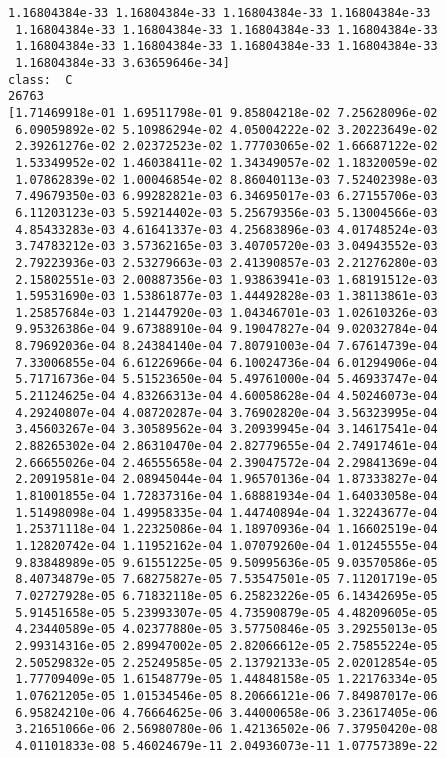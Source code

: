 \documentclass[11pt]{article}
\begin{document}
\begin{Verbatim}[commandchars=\\\{\}]
 1.16804384e-33 1.16804384e-33 1.16804384e-33 1.16804384e-33
 1.16804384e-33 1.16804384e-33 1.16804384e-33 1.16804384e-33
 1.16804384e-33 1.16804384e-33 1.16804384e-33 1.16804384e-33
 1.16804384e-33 3.63659646e-34]
class:  C
26763
[1.71469918e-01 1.69511798e-01 9.85804218e-02 7.25628096e-02
 6.09059892e-02 5.10986294e-02 4.05004222e-02 3.20223649e-02
 2.39261276e-02 2.02372523e-02 1.77703065e-02 1.66687122e-02
 1.53349952e-02 1.46038411e-02 1.34349057e-02 1.18320059e-02
 1.07862839e-02 1.00046854e-02 8.86040113e-03 7.52402398e-03
 7.49679350e-03 6.99282821e-03 6.34695017e-03 6.27155706e-03
 6.11203123e-03 5.59214402e-03 5.25679356e-03 5.13004566e-03
 4.85433283e-03 4.61641337e-03 4.25683896e-03 4.01748524e-03
 3.74783212e-03 3.57362165e-03 3.40705720e-03 3.04943552e-03
 2.79223936e-03 2.53279663e-03 2.41390857e-03 2.21276280e-03
 2.15802551e-03 2.00887356e-03 1.93863941e-03 1.68191512e-03
 1.59531690e-03 1.53861877e-03 1.44492828e-03 1.38113861e-03
 1.25857684e-03 1.21447920e-03 1.04346701e-03 1.02610326e-03
 9.95326386e-04 9.67388910e-04 9.19047827e-04 9.02032784e-04
 8.79692036e-04 8.24384140e-04 7.80791003e-04 7.67614739e-04
 7.33006855e-04 6.61226966e-04 6.10024736e-04 6.01294906e-04
 5.71716736e-04 5.51523650e-04 5.49761000e-04 5.46933747e-04
 5.21124625e-04 4.83266313e-04 4.60058628e-04 4.50246073e-04
 4.29240807e-04 4.08720287e-04 3.76902820e-04 3.56323995e-04
 3.45603267e-04 3.30589562e-04 3.20939945e-04 3.14617541e-04
 2.88265302e-04 2.86310470e-04 2.82779655e-04 2.74917461e-04
 2.66655026e-04 2.46555658e-04 2.39047572e-04 2.29841369e-04
 2.20919581e-04 2.08945044e-04 1.96570136e-04 1.87333827e-04
 1.81001855e-04 1.72837316e-04 1.68881934e-04 1.64033058e-04
 1.51498098e-04 1.49958335e-04 1.44740894e-04 1.32243677e-04
 1.25371118e-04 1.22325086e-04 1.18970936e-04 1.16602519e-04
 1.12820742e-04 1.11952162e-04 1.07079260e-04 1.01245555e-04
 9.83848989e-05 9.61551225e-05 9.50995636e-05 9.03570586e-05
 8.40734879e-05 7.68275827e-05 7.53547501e-05 7.11201719e-05
 7.02727928e-05 6.71832118e-05 6.25823226e-05 6.14342695e-05
 5.91451658e-05 5.23993307e-05 4.73590879e-05 4.48209605e-05
 4.23440589e-05 4.02377880e-05 3.57750846e-05 3.29255013e-05
 2.99314316e-05 2.89947002e-05 2.82066612e-05 2.75855224e-05
 2.50529832e-05 2.25249585e-05 2.13792133e-05 2.02012854e-05
 1.77709409e-05 1.61548779e-05 1.44848158e-05 1.22176334e-05
 1.07621205e-05 1.01534546e-05 8.20666121e-06 7.84987017e-06
 6.95824210e-06 4.76664625e-06 3.44000658e-06 3.23617405e-06
 3.21651066e-06 2.56980780e-06 1.42136502e-06 7.37950420e-08
 4.01101833e-08 5.46024679e-11 2.04936073e-11 1.07757389e-22

\end{Verbatim}
\end{document}
